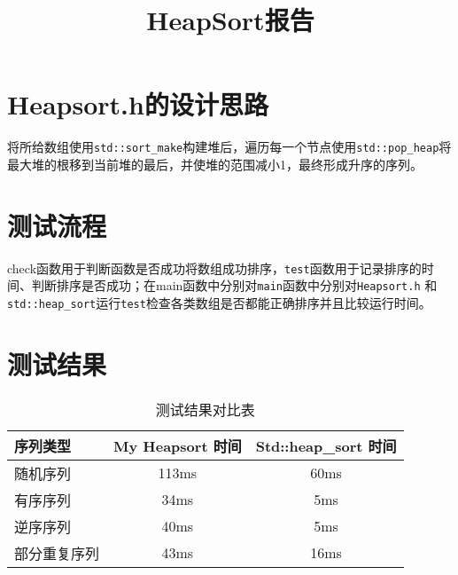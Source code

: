 \documentclass{article}
\title{HeapSort报告}
\author{}
\date{}
\begin{document}
\maketitle
\section{Heapsort.h的设计思路}
将所给数组使用\texttt{std::sort\_make}构建堆后，遍历每一个节点使用\texttt{std::pop\_heap}将最大堆的根移到当前堆的最后，并使堆的范围减小1，最终形成升序的序列。
\section{测试流程}
check函数用于判断函数是否成功将数组成功排序，\texttt{test}函数用于记录排序的时间、判断排序是否成功；在main函数中分别对\texttt{main}函数中分别对\texttt{Heapsort.h} 和\texttt{std::heap\_sort}运行\texttt{test}检查各类数组是否都能正确排序并且比较运行时间。
\section{测试结果}
\begin{table}[h!]
    \centering
    \begin{tabular}{|l|c|c|}
    \hline
    序列类型 & My Heapsort 时间 & Std::heap\_sort 时间 \\
    \hline  
    随机序列 & 113ms & 60ms \\
    \hline 
    有序序列 & 34ms & 5ms \\
    \hline
    逆序序列 & 40ms & 5ms \\
    \hline
    部分重复序列 & 43ms & 16ms \\
    \hline
    \end{tabular}
    \caption{测试结果对比表}
    \end{table}
\end{document}
